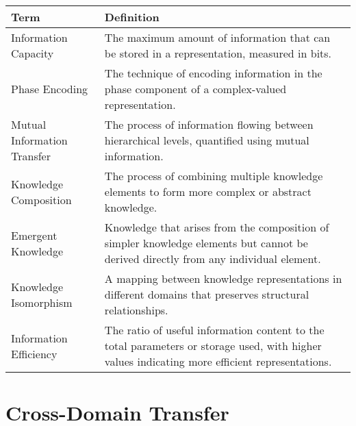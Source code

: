 \begin{center}
\begin{tabular}{|l|p{12cm}|}
\hline
\textbf{Term} & \textbf{Definition} \\
\hline
Information Capacity & The maximum amount of information that can be stored in a representation, measured in bits. \\
\hline
Phase Encoding & The technique of encoding information in the phase component of a complex-valued representation. \\
\hline
Mutual Information Transfer & The process of information flowing between hierarchical levels, quantified using mutual information. \\
\hline
Knowledge Composition & The process of combining multiple knowledge elements to form more complex or abstract knowledge. \\
\hline
Emergent Knowledge & Knowledge that arises from the composition of simpler knowledge elements but cannot be derived directly from any individual element. \\
\hline
Knowledge Isomorphism & A mapping between knowledge representations in different domains that preserves structural relationships. \\
\hline
Information Efficiency & The ratio of useful information content to the total parameters or storage used, with higher values indicating more efficient representations. \\
\hline
\end{tabular}
\label{tab:information_terminology}
\end{center}

\section{Cross-Domain Transfer}

